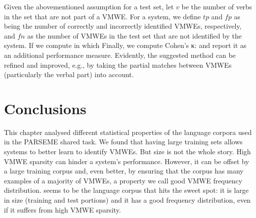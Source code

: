\documentclass[output=paper,modfonts,nonflat,draftmode]{langsci/langscibook}
\begin{document}
Given the abovementioned assumption for a test set, let $v$ be the number of verbs in the set that are not part of a VMWE. For a system, we define $tp$ and $fp$ as being the number of correctly and incorrectly identified VMWEs, respectively, and $fn$ as the number of VMWEs in the test set that are not identified by the system. If 
we compute 
in which
Finally, we compute Cohen's κ:
and report it as an additional performance measure. Evidently, the suggested method can be refined and improved, e.g., by taking the partial matches between VMWEs (particularly the verbal part) into account.




\section{Conclusions}
\label{conclude}

This chapter analysed different statistical properties of the language corpora used in the PARSEME shared task. We found that having large training sets allows systems to better learn to identify VMWEs. But size is not the whole story. High VMWE sparsity can hinder a system's performance. However, it can be offset by a large training corpus and, even better, by ensuring that the corpus has many examples of a majority of VMWEs, a property we call good VMWE frequency distribution.  seems to be the language corpus that hits the sweet spot: it is large in size (training and test portions) and it has a good frequency distribution, even if it suffers from high VMWE sparsity. 
\end{document}
